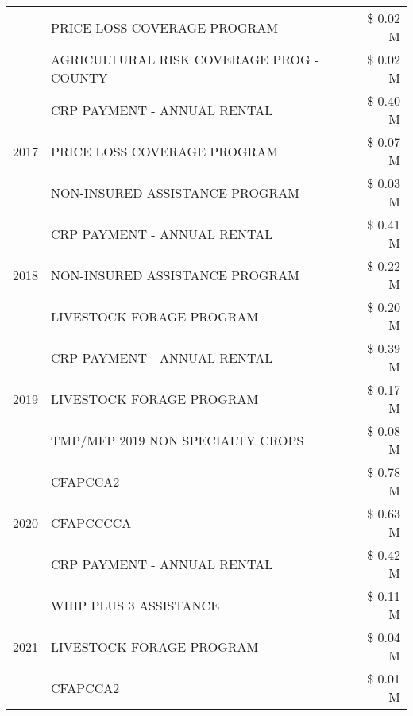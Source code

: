 \begin{tabular}{llr}
 & PRICE LOSS COVERAGE PROGRAM                   & \$ 0.02 M \\
 & AGRICULTURAL RISK COVERAGE PROG - COUNTY      & \$ 0.02 M \\
\cline{1-3}
\multirow[t]{3}{*}{2017} & CRP PAYMENT - ANNUAL RENTAL & \$ 0.40 M \\
 & PRICE LOSS COVERAGE PROGRAM & \$ 0.07 M \\
 & NON-INSURED ASSISTANCE PROGRAM & \$ 0.03 M \\
\cline{1-3}
\multirow[t]{3}{*}{2018} & CRP PAYMENT - ANNUAL RENTAL & \$ 0.41 M \\
 & NON-INSURED ASSISTANCE PROGRAM & \$ 0.22 M \\
 & LIVESTOCK FORAGE PROGRAM & \$ 0.20 M \\
\cline{1-3}
\multirow[t]{3}{*}{2019} & CRP PAYMENT - ANNUAL RENTAL & \$ 0.39 M \\
 & LIVESTOCK FORAGE PROGRAM & \$ 0.17 M \\
 & TMP/MFP 2019 NON SPECIALTY CROPS & \$ 0.08 M \\
\cline{1-3}
\multirow[t]{3}{*}{2020} & CFAPCCA2 & \$ 0.78 M \\
 & CFAPCCCCA & \$ 0.63 M \\
 & CRP PAYMENT - ANNUAL RENTAL & \$ 0.42 M \\
\cline{1-3}
\multirow[t]{3}{*}{2021} & WHIP PLUS 3 ASSISTANCE & \$ 0.11 M \\
 & LIVESTOCK FORAGE PROGRAM & \$ 0.04 M \\
 & CFAPCCA2 & \$ 0.01 M \\
\cline{1-3}
\bottomrule
\end{tabular}
